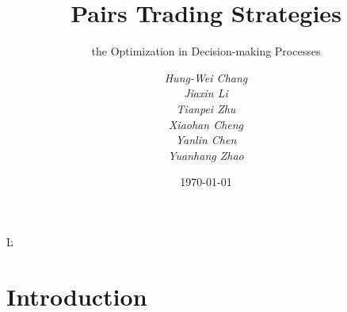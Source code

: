 \documentclass{beamer}
\begin{document}
\title{Pairs Trading Strategies}
\subtitle{the Optimization in Decision-making Processes}
\author[Group 6]{\scriptsize \emph{Hung-Wei Chang\\Jiaxin Li\\Tianpei Zhu\\Xiaohan Cheng\\Yanlin Chen\\Yuanhang Zhao}}
\subject{Presentation Programs}

\date{\today}

\frame{\titlepage}

\begin{frame}{Ŀ}%
	\tableofcontents
\end{frame}

\section{Introduction}
\end{document}
